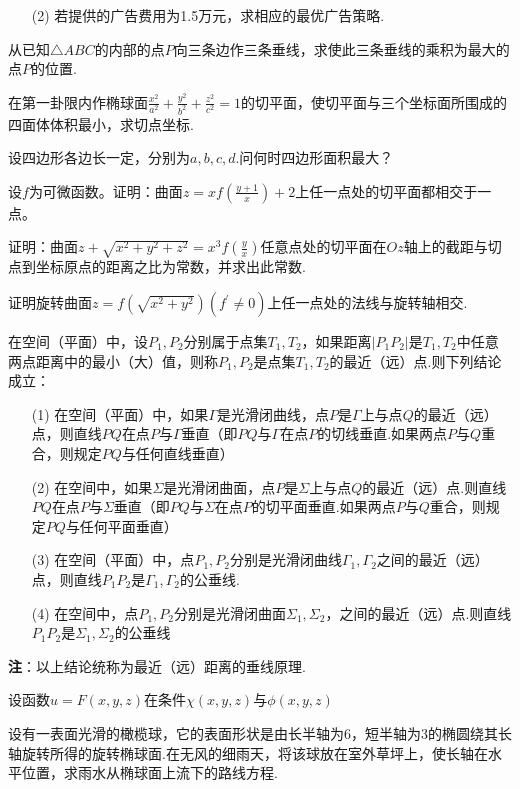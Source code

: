 \begin{xiti}
\begin{enumerate}
		\item [(2)]若提供的广告费用为1.5万元，求相应的最优广告策略.
	\end{enumerate}
	\item 从已知$\triangle ABC$的内部的点$P$向三条边作三条垂线，求使此三条垂线的乘积为最大的点$P$的位置.
	
	\item 在第一卦限内作椭球面$\frac{x^{2}}{a^{2}}+\frac{y^{2}}{b^{2}}+\frac{z^{2}}{c^{2}}=1$的切平面，使切平面与三个坐标面所围成的四面体体积最小，求切点坐标.
	
	\item 设四边形各边长一定，分别为$a,b,c,d$.问何时四边形面积最大？
	
	\item 设$f$为可微函数。证明：曲面$z=x f\left(\frac{y+1}{x}\right)+2$上任一点处的切平面都相交于一点。
	\item 证明：曲面$z+\sqrt{x^{2}+y^{2}+z^{2}}=x^{3} f\left(\frac{y}{x}\right)$任意点处的切平面在$Oz$轴上的截距与切点到坐标原点的距离之比为常数，并求出此常数.
	\item 证明旋转曲面$z=f\left(\sqrt{x^{2}+y^{2}}\right)\left(f^{\prime} \neq 0\right)$上任一点处的法线与旋转轴相交.
	\item 在空间（平面）中，设$P_{1}, P_{2}$分别属于点集$T_{1}, T_{2}$，如果距离$\left|P_{1} P_{2}\right|$是$T_{1}, T_{2}$中任意两点距离中的最小（大）值，则称$P_{1}, P_{2}$是点集$T_{1}, T_{2}$的最近（远）点.则下列结论成立：
	\begin{enumerate}
		\item [(1)]在空间（平面）中，如果$\Gamma$是光滑闭曲线，点$P$是$\Gamma$上与点$Q$的最近（远）点，则直线$PQ$在点$P$与$\Gamma$垂直（即$PQ$与$\Gamma$在点$P$的切线垂直.如果两点$P$与$Q$重合，则规定$PQ$与任何直线垂直）
		\item [(2)]在空间中，如果$\Sigma$是光滑闭曲面，点$P$是$\Sigma$上与点$Q$的最近（远）点.则直线$PQ$在点$P$与$\Sigma $垂直（即$PQ$与$\Sigma$在点$P$的切平面垂直.如果两点$P$与$Q$重合，则规定$PQ$与任何平面垂直）
		\item [(3)]在空间（平面）中，点$P_{1},P_{2}$分别是光滑闭曲线$\Gamma_{1}, \Gamma_{2}$之间的最近（远）点，则直线$P_{1}P_{2}$是$\Gamma_{1}, \Gamma_{2}$的公垂线.
		
		\item [(4)]在空间中，点$P_{1},P_{2}$分别是光滑闭曲面$\Sigma_{1}, \Sigma_{2}$，之间的最近（远）点.则直线$P_{1}P_{2}$是$\Sigma_{1}, \Sigma_{2}$的公垂线
		
	\end{enumerate}
\textbf{注}：以上结论统称为最近（远）距离的垂线原理.
	 \item 设函数$u=F(x, y, z)$在条件$\chi(x,y,z)$与$\phi(x,y,z)$
	 \item 设有一表面光滑的橄榄球，它的表面形状是由长半轴为6，短半轴为3的椭圆绕其长轴旋转所得的旋转椭球面.在无风的细雨天，将该球放在室外草坪上，使长轴在水平位置，求雨水从椭球面上流下的路线方程.
\end{xiti}
